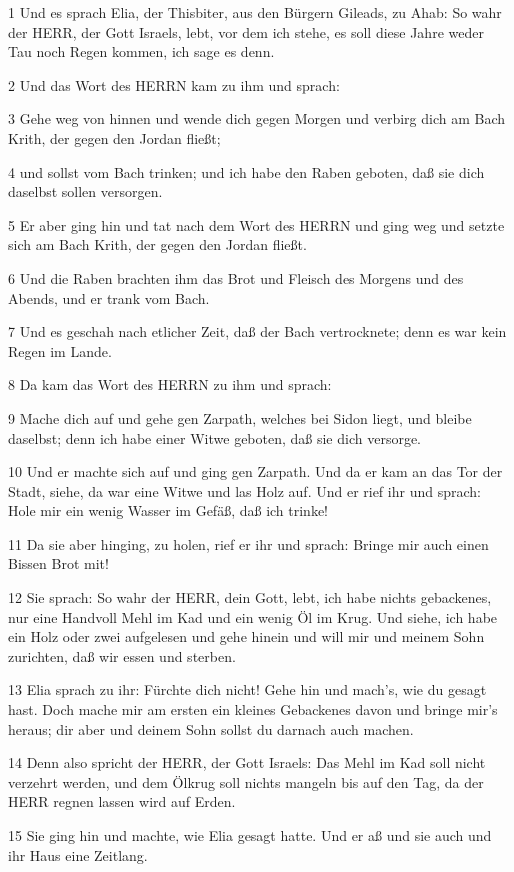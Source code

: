 \par 1 Und es sprach Elia, der Thisbiter, aus den Bürgern Gileads, zu Ahab: So wahr der HERR, der Gott Israels, lebt, vor dem ich stehe, es soll diese Jahre weder Tau noch Regen kommen, ich sage es denn.
\par 2 Und das Wort des HERRN kam zu ihm und sprach:
\par 3 Gehe weg von hinnen und wende dich gegen Morgen und verbirg dich am Bach Krith, der gegen den Jordan fließt;
\par 4 und sollst vom Bach trinken; und ich habe den Raben geboten, daß sie dich daselbst sollen versorgen.
\par 5 Er aber ging hin und tat nach dem Wort des HERRN und ging weg und setzte sich am Bach Krith, der gegen den Jordan fließt.
\par 6 Und die Raben brachten ihm das Brot und Fleisch des Morgens und des Abends, und er trank vom Bach.
\par 7 Und es geschah nach etlicher Zeit, daß der Bach vertrocknete; denn es war kein Regen im Lande.
\par 8 Da kam das Wort des HERRN zu ihm und sprach:
\par 9 Mache dich auf und gehe gen Zarpath, welches bei Sidon liegt, und bleibe daselbst; denn ich habe einer Witwe geboten, daß sie dich versorge.
\par 10 Und er machte sich auf und ging gen Zarpath. Und da er kam an das Tor der Stadt, siehe, da war eine Witwe und las Holz auf. Und er rief ihr und sprach: Hole mir ein wenig Wasser im Gefäß, daß ich trinke!
\par 11 Da sie aber hinging, zu holen, rief er ihr und sprach: Bringe mir auch einen Bissen Brot mit!
\par 12 Sie sprach: So wahr der HERR, dein Gott, lebt, ich habe nichts gebackenes, nur eine Handvoll Mehl im Kad und ein wenig Öl im Krug. Und siehe, ich habe ein Holz oder zwei aufgelesen und gehe hinein und will mir und meinem Sohn zurichten, daß wir essen und sterben.
\par 13 Elia sprach zu ihr: Fürchte dich nicht! Gehe hin und mach's, wie du gesagt hast. Doch mache mir am ersten ein kleines Gebackenes davon und bringe mir's heraus; dir aber und deinem Sohn sollst du darnach auch machen.
\par 14 Denn also spricht der HERR, der Gott Israels: Das Mehl im Kad soll nicht verzehrt werden, und dem Ölkrug soll nichts mangeln bis auf den Tag, da der HERR regnen lassen wird auf Erden.
\par 15 Sie ging hin und machte, wie Elia gesagt hatte. Und er aß und sie auch und ihr Haus eine Zeitlang.
